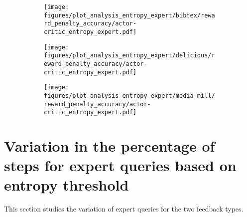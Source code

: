 \begin{figure}[H]
    \begin{subfigure}[b]{0.32\columnwidth}
        \centering
        \texttt{[image: figures/plot\_analysis\_entropy\_expert/bibtex/reward\_penalty\_accuracy/actor-critic\_entropy\_expert.pdf]}
    \end{subfigure}
    \hfill
    \begin{subfigure}[b]{0.32\columnwidth}
        \centering
        \texttt{[image: figures/plot\_analysis\_entropy\_expert/delicious/reward\_penalty\_accuracy/actor-critic\_entropy\_expert.pdf]}
    \end{subfigure}
    \hfill
    \begin{subfigure}[b]{0.32\columnwidth}
        \centering
        \texttt{[image: figures/plot\_analysis\_entropy\_expert/media\_mill/reward\_penalty\_accuracy/actor-critic\_entropy\_expert.pdf]}
    \end{subfigure}
    \hfill
   
   
\end{figure}

\section{Variation in the percentage of steps for expert queries based on entropy threshold}
\label{sec:app_var_exp_query_percentage}

This section studies the variation of expert queries for the two feedback types.

